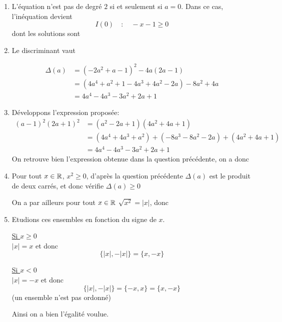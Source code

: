 \documentclass[a4paper, 11pt]{article}
\begin{document}
\begin{correction}
    \begin{enumerate}
        \item L'équation n'est pas de degré $2$ si et seulement si $a=0$. Dans ce cas, l'inéquation devient 
        $$I(0) \quad :\quad  -x-1\geq 0$$
        dont les solutions sont 
        \conclusion{ $\cS_0 = ]-\infty , -1]$}
        \item Le discriminant vaut 
        
        \begin{align*}
            \Delta(a) &= (-2a^2 +a-1)^2 -4a(2a-1)\\
                      &= (4a^4 +a^2 +1 -4a^3 +4a^2 -2a) -8a^2 +4a\\
                      &= 4a^4 -4a^3-3a^2+2a+1
        \end{align*}
        \item Développons l'expression proposée: 
        \begin{align*}
            (a-1)^2 (2a+1)^2 &= (a^2 -2a+1) (4a^2 +4a+1)\\
                            &= (4a^4 +4a^3+a^2) +(-8a^3-8a^2-2a) +(4a^2 +4a+1)\\
                            &= 4a^4 -4a^3 -3a^2 +2a+1
        \end{align*}    
            On retrouve bien l'expression obtenue dans la question précédente, on a donc 

        \item Pour tout $x\in \mathbb{R}$, $x^2 \geq 0$, d'après la question précédente $\Delta(a)$ est le produit de deux carrés, et donc vérifie $\Delta(a)\geq0$

        On a par ailleurs pour tout $x\in \mathbb{R} $ $\sqrt{x^2} =|x|$, donc 

        \item Etudions ces ensembles en fonction du signe de $x$.
        
        \underline{Si $x\geq 0$}\\
        $|x|=x$  et donc 
        $$\{|x|,-|x|\}= \{x,-x\}$$

        \underline{Si $x< 0$}\\
        $|x|=-x$  et donc 
        $$\{|x|,-|x|\}= \{-x,x\}=\{x,-x\}$$    
        (un ensemble n'est pas ordonné)

        Ainsi on a bien l'égalité voulue. 


\end{enumerate}
\end{correction}
\end{document}
